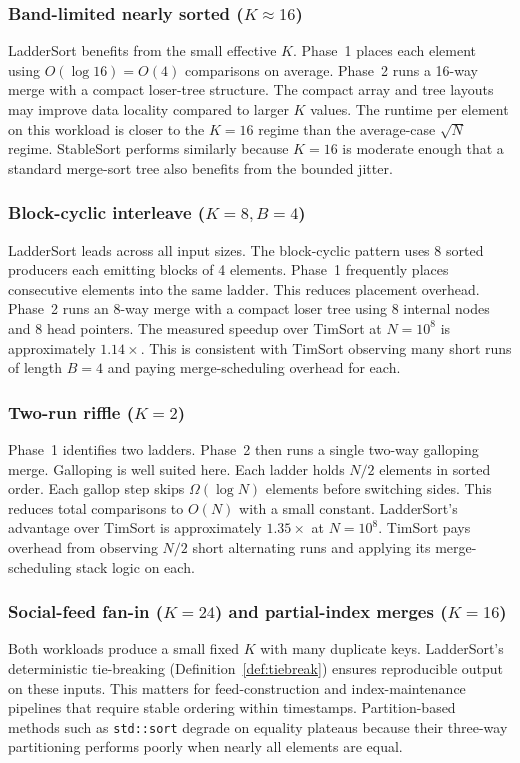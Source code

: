 \documentclass{ieeeaccess}
\theoremstyle{plain}
\theoremstyle{definition}
\begin{document}
\subsubsection{Band-limited nearly sorted ($K \approx 16$)}
LadderSort benefits from the small effective $K$. Phase~1 places each element using $O(\log 16) = O(4)$ comparisons on average. Phase~2 runs a 16-way merge with a compact loser-tree structure. The compact array and tree layouts may improve data locality compared to larger $K$ values. The runtime per element on this workload is closer to the $K=16$ regime than the average-case $\sqrt{N}$ regime. StableSort performs similarly because $K=16$ is moderate enough that a standard merge-sort tree also benefits from the bounded jitter.

\subsubsection{Block-cyclic interleave ($K=8, B=4$)}
LadderSort leads across all input sizes. The block-cyclic pattern uses 8 sorted producers each emitting blocks of 4 elements. Phase~1 frequently places consecutive elements into the same ladder. This reduces placement overhead. Phase~2 runs an 8-way merge with a compact loser tree using 8 internal nodes and 8 head pointers. The measured speedup over TimSort at $N=10^8$ is approximately $1.14\times$. This is consistent with TimSort observing many short runs of length $B=4$ and paying merge-scheduling overhead for each.

\subsubsection{Two-run riffle ($K=2$)}
Phase~1 identifies two ladders. Phase~2 then runs a single two-way galloping merge. Galloping is well suited here. Each ladder holds $N/2$ elements in sorted order. Each gallop step skips $\Omega(\log N)$ elements before switching sides. This reduces total comparisons to $O(N)$ with a small constant. LadderSort's advantage over TimSort is approximately $1.35\times$ at $N=10^8$. TimSort pays overhead from observing $N/2$ short alternating runs and applying its merge-scheduling stack logic on each.

\subsubsection{Social-feed fan-in ($K=24$) and partial-index merges ($K=16$)}
Both workloads produce a small fixed $K$ with many duplicate keys. LadderSort's deterministic tie-breaking (Definition~\ref{def:tiebreak}) ensures reproducible output on these inputs. This matters for feed-construction and index-maintenance pipelines that require stable ordering within timestamps. Partition-based methods such as \texttt{std::sort} degrade on equality plateaus because their three-way partitioning performs poorly when nearly all elements are equal.
\end{document}
